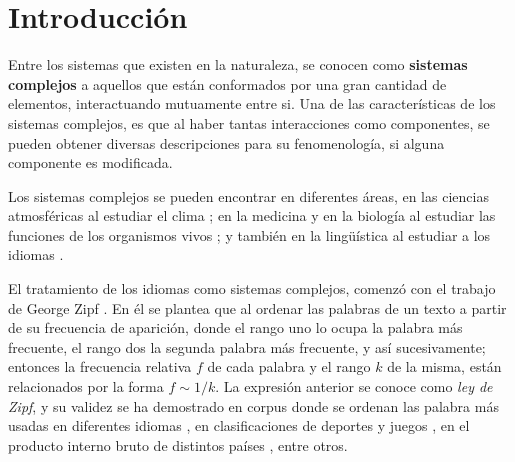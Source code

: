 \chapter{Introducción}

Entre los sistemas que existen en la naturaleza, se conocen como  \textbf{sistemas complejos} a aquellos que  están conformados por una gran cantidad de elementos, interactuando mutuamente entre si. Una de las características de los sistemas complejos, es que al haber tantas interacciones como componentes, se pueden obtener diversas descripciones para su fenomenología,  si alguna componente es modificada.





Los sistemas complejos se pueden encontrar en diferentes áreas, en las ciencias atmosféricas al estudiar el clima \cite{complex_climate};  en la medicina y en la biología al estudiar las funciones de los organismos vivos  \cite{complex_medicine}; y también en la lingüística al estudiar a los idiomas  \cite{complex_language} .

El tratamiento de los idiomas como sistemas complejos, comenzó con el trabajo de George Zipf \cite{zipf}. En él se plantea que al ordenar las palabras de un texto a partir de su frecuencia de aparición, donde el rango uno lo ocupa la palabra más frecuente, el rango dos la segunda palabra más frecuente, y así sucesivamente; entonces la frecuencia relativa $f$ de cada palabra y el rango $k$ de la misma, están relacionados por la forma $f\sim1/k$. La expresión anterior se conoce como \textit{ley de Zipf}, y su validez se ha demostrado en corpus donde se ordenan las palabra más usadas en diferentes idiomas \cite{tesis.sergio}, en clasificaciones de deportes y juegos \cite{epj}, en el producto interno bruto de distintos países \cite{zipf_gdp}, entre otros. 

